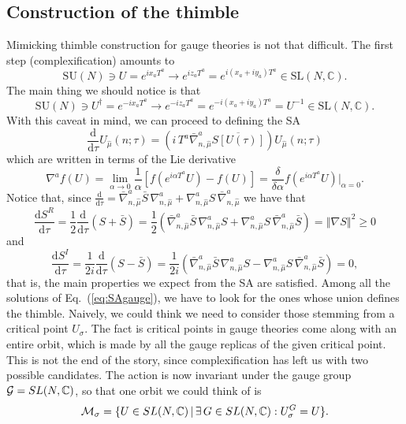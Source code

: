 \documentclass[a4paper,11pt]{article}
\let\l\left
\let\r\right
\let\mrm\mathrm
\let\mbb\mathbb
\let\dag\dagger
\newcommand{\muh}{{\hat{\mu}}}
\begin{document}
\subsection{Construction of the thimble}
Mimicking thimble construction for gauge theories is not that
difficult. The first step (complexification) amounts to
\begin{equation}
\mrm{SU}\l(N\r)\ni U=e^{i x_aT^a}\rightarrow e^{i z_aT^a}=e^{i \l(x_a+i y_a\r)T^a}\in\mrm{SL}\l(N,\mbb{C}\r).
\end{equation}
The main thing we should notice is that
$$
\mathrm{SU}\left(N\right)\ni U^\dag=e^{-i x_aT^a}\rightarrow e^{-i z_aT^a}=e^{-i \left(x_a+i y_a\right)T^a}=U^{-1}\in\mathrm{SL}\left(N,\mathbb{C}\right).
$$
With this caveat in mind, we can proceed to defining the SA
\begin{equation}\label{eq:SAgauge}
\frac{\mrm{d}}{\mrm{d}\tau}U_\muh\l(n;\tau\r)=\l(i\,T^a\bar{\nabla}_{n,\muh}^a\overline{S\l[U\l(\tau\r)\r]}\r)U_\muh\l(n;\tau\r)
\end{equation}
which are written in terms of the Lie derivative
$$
\nabla^af\left(U\right)=\lim_{\alpha\rightarrow 0}\frac{1}{\alpha}\left[f\left(e^{i\alpha T^a}U\right)-f\left(U\right)\right]=\frac{\delta}{\delta\alpha}f\left(e^{i\alpha T^a}U\right)\biggl|_{\alpha=0}.
$$
Notice that, since $\frac{\mrm{d}}{\mrm{d}\tau}=
\bar{\nabla}_{n,\muh}^a\bar{S}\,\nabla_{n,\muh}^a+
\nabla_{n,\muh}^aS\,\bar{\nabla}_{n,\muh}^a$ we have that 
$$
\frac{\mrm{d}S^R}{\mrm{d}\tau}=\frac{1}{2}\frac{\mrm{d}}{\mrm{d}\tau}\l(S+\bar{S}\r)=\frac{1}{2}\l(\bar{\nabla}_{n,\muh}^a\bar{S}\,\nabla_{n,\muh}^a S+\nabla_{n,\muh}^aS\,\bar{\nabla}_{n,\muh}^a\bar{S}\r)=\left\Vert\nabla S\right\Vert^2\geq0
$$
and
$$
\frac{\mrm{d}S^I}{\mrm{d}\tau}=\frac{1}{2i}\frac{\mrm{d}}{\mrm{d}\tau}\l(S-\bar{S}\r)=\frac{1}{2i}\l(\bar{\nabla}_{n,\muh}^a\bar{S}\,\nabla_{n,\muh}^a S-\nabla_{n,\muh}^aS\,\bar{\nabla}_{n,\muh}^a\bar{S}\r)=0,
$$
that is, the main properties we expect from the SA are satisfied. 
Among all the solutions of Eq.~(\ref{eq:SAgauge}), we have to
look for the ones whose union defines the thimble. Naively, we could
think we need to
consider those stemming from a critical point $U_\sigma$. The fact is critical
points in gauge theories come along with an entire orbit, which is
made by all the gauge replicas of the given critical point. This
is not the end of the story, since complexification has left us with
two possible candidates. The action is now invariant under the gauge
group ${\cal G}=SL(N,\mbb{C})$, so that one orbit we could think of is
$$
{\cal M_\sigma} = \{U \in SL(N,\mbb{C}) \,|\, \exists \,G\in SL(N,\mbb{C}) :
  U_\sigma^G = U\}.
$$  
\end{document}
